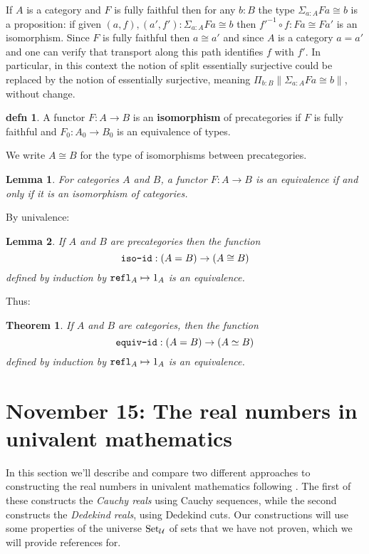 \documentclass{amsart}
\theoremstyle{theorem}
\newtheorem*{thm}{Theorem}
\newtheorem*{lem}{Lemma}
\theoremstyle{definition}
\newtheorem*{defn}{defn}
\theoremstyle{remark}
\newcommand{\0}{\mathbbe{0}}
\newcommand{\1}{\mathbbe{1}}
\newcommand{\2}{\mathbbe{2}}
\newcommand{\3}{\mathbbe{3}}
\newcommand{\4}{\mathbbe{4}}
\newcommand{\term}[1]{{\textup{\texttt{#1}}}}
\newcommand{\type}[1]{{\textup{#1}}}
\newcommand{\refl}{\term{refl}}
\newcommand{\UU}{{\mathcal{U}}}
\newcommand{\Set}{\type{Set}_{\UU}}
\begin{document}
If $A$ is a category and $F$ is fully faithful then for any $b : B$ the type $\Sigma_{a:A} Fa \cong b$ is a proposition: if given $(a,f),(a',f') : \Sigma_{a:A} Fa \cong b$ then $f'^{-1} \circ f \colon Fa \cong Fa'$ is an isomorphism. Since $F$ is fully faithful then $a \cong a'$ and since $A$ is a category $a=a'$ and one can verify that transport along this path identifies $f$ with $f'$. In particular, in this context the notion of split essentially surjective could be replaced by the notion of essentially surjective, meaning $\Pi_{b:B} \|\Sigma_{a:A} Fa \cong b\|$, without change.

\begin{defn} A functor $F \colon A \to B$ is an \textbf{isomorphism} of precategories if $F$ is fully faithful and $F_0 : A_0 \to B_0$ is an equivalence of types.
\end{defn}

We write $A \cong B$ for the type of isomorphisms between precategories.

\begin{lem} For categories $A$ and $B$, a functor $F \colon A \to B$ is an equivalence if and only if it is an isomorphism of categories.
\end{lem}

By univalence: 
\begin{lem} If $A$ and $B$ are precategories then the function 
\[ \term{iso-id} : (A=B) \to (A \cong B)\]
defined by induction by $\refl_A \mapsto 1_A$ is an equivalence.
\end{lem}

Thus:

\begin{thm} If $A$ and $B$ are categories, then the function 
\[ \term{equiv-id} : (A=B) \to (A \simeq B)\]
defined by induction by $\refl_A\mapsto 1_A$ is an equivalence.
\end{thm}


\section*{November 15: The real numbers in univalent mathematics}

In this section we'll describe and compare two different approaches to constructing the real numbers in univalent mathematics following \cite[Chapter 10]{book-hott}. The first of these constructs the \emph{Cauchy reals} using Cauchy sequences, while the second constructs the \emph{Dedekind reals}, using Dedekind cuts. Our constructions will use some properties of the universe $\Set$ of sets that we have not proven, which we will provide references for.
\end{document}
